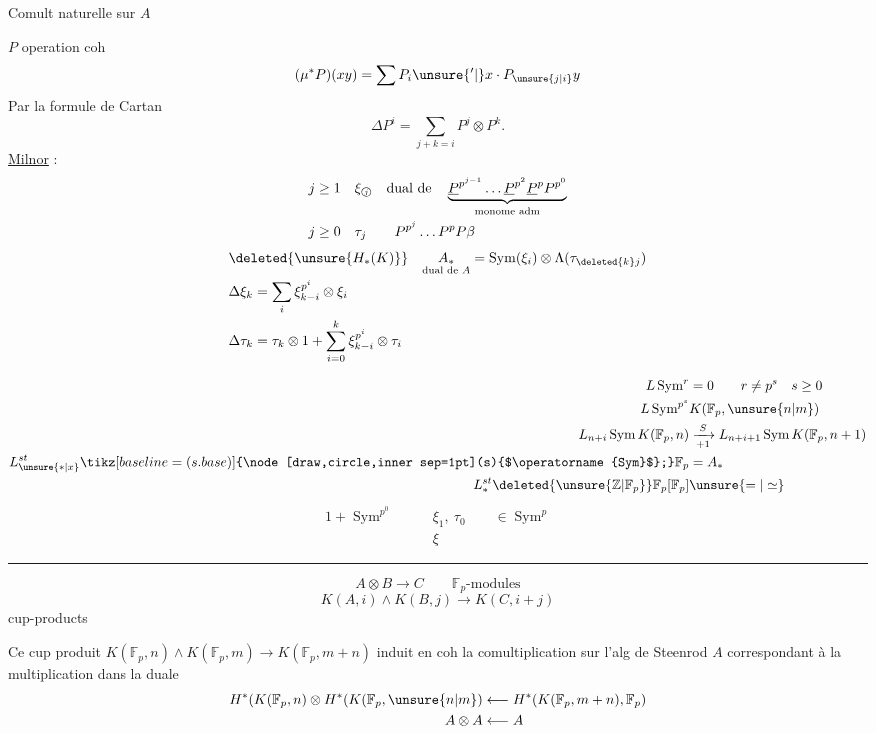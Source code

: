 Comult naturelle sur $A$

$P$ operation coh
\[
(\mu^{*}P)(xy)=\sum P_i\unsure{{}'|{}}x\cdot P_{\unsure{j|i}}y
\]
Par la formule de Cartan
\[
\Delta P^i=\sum_{j+k=i}P^j\otimes P^k .
\]
\uline{Milnor} :
\[
\begin{aligned}
j\geq1\quad&\xi_{\text{\textcircled{$\scriptstyle j$}}}\quad\text{dual de}\quad
\underbrace{\underline P^{p^{j-1}}\ldots\underline P^{p^2}\underline P^{p}P^{p^0}}_{\text{monome adm}}\\
j\geq0\quad&\tau_j\qquad P^{p^j}\ldots P^p P\beta
\end{aligned}
\]
\[
\begin{aligned}
&\deleted{\unsure{H_{*}(K)}}\quad\underset{\text{dual de $A$}}{A_{*}}
=\operatorname{Sym}(\xi_i)\otimes\Lambda(\tau_{\deleted{k}j})\\
&\Delta\xi_k=\sum_i\xi_{k-i}^{p^i}\otimes\xi_i\\
&\Delta\tau_k=\tau_k\otimes1+\sum_{i=0}^{k}\xi_{k-i}^{p^i}\otimes\tau_i
\end{aligned}
\]

\[
\begin{aligned}
L\operatorname{Sym}^{r}&=0\qquad r\ne p^s\quad s\geq0\\
L\operatorname{Sym}^{p^s}&K(\mathbb F_p,\unsure{n|m})\\
L_{n+i}\operatorname{Sym} K(\mathbb F_p,n)&
\xrightarrow[+1]{S}L_{n+i+1}\operatorname{Sym}K(\mathbb F_p,n+1)\\
L_{\unsure{*|x}}^{st}\tikz[baseline=(s.base)]{\node[draw,circle,inner sep=1pt](s){$\operatorname{Sym}$};}\mathbb F_p&=A_{*}\\
L_{*}^{st}\deleted{\unsure{\mathbb Z|\mathbb F_p}}\mathbb F_p[\mathbb F_p]&\unsure{=|\simeq}
\end{aligned}
\]
\[
\begin{aligned}
1+\operatorname{Sym}^{p^0}\qquad&\xi_1,\ \tau_0\qquad\in\operatorname{Sym}^{p}\\
&\xi
\end{aligned}
\]

\begin{center}\rule{.8\linewidth}{0.3pt}\end{center}
\[
A\otimes B\longrightarrow C\qquad \mathbb F_p\text{-modules}
\]
\[
K(A,i)\wedge K(B,j)\longrightarrow K(C,i+j)
\]
cup-products 

Ce cup produit $K(\mathbb F_p,n)\wedge K(\mathbb F_p,m)\longrightarrow K(\mathbb F_p,m+n)$ induit en coh la comultiplication sur l'alg de Steenrod $A$ correspondant à la multiplication dans la duale
\[
\begin{aligned}
H^{*}(K(\mathbb F_p,n)\otimes H^{*}(K(\mathbb F_p,\unsure{n|m})
&\longleftarrow H^{*}(K(\mathbb F_p,m+n),\mathbb F_p)\\
A\otimes A&\longleftarrow A
\end{aligned}
\]
